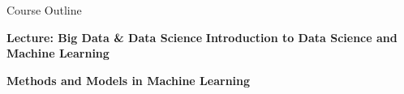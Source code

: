 \documentclass[document.tex]{subfiles}
\begin{document}
    \begin{frame}{Course Outline}
        \begin{minipage}[t]{.5\textwidth}
            \textbf{Lecture: Big Data \& Data Science}
            \tableofcontents[hideallsubsections]       
            \vspace{4.22mm}
            \textbf{Introduction to Data Science and Machine Learning}
            \vspace{1.22mm}
            \tableofcontents[hideallsubsections, sections={1-7}, part=1]  
        \end{minipage}%
        \begin{minipage}[t]{.5\textwidth}
            \textbf{Methods and Models in Machine Learning}
            \tableofcontents[hideallsubsections, sections={4-9}, part=2]
        \end{minipage}
    \end{frame}
\end{document}
